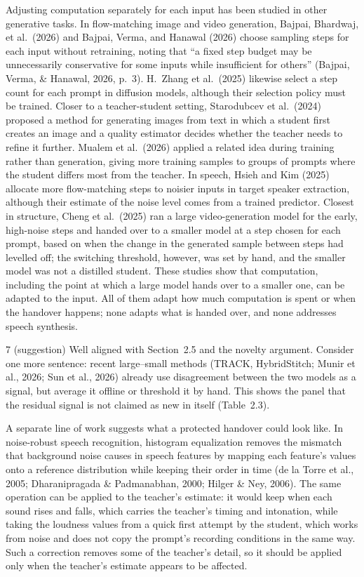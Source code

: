 \documentclass[11pt,a4paper]{article}
\newcommand{\add}[1]{{\color{addcol}#1}}
\newcounter{cmt}
\begin{document}
Adjusting computation separately for each input has been studied in other generative tasks. In flow-matching image and video generation, Bajpai, Bhardwaj, et al.\ (2026) and Bajpai, Verma, and Hanawal (2026) choose sampling steps for each input without retraining, noting that ``a fixed step budget may be unnecessarily conservative for some inputs while insufficient for others'' (Bajpai, Verma, \& Hanawal, 2026, p.~3). H.\ Zhang et al.\ (2025) likewise select a step count for each prompt in diffusion models, although their selection policy must be trained. Closer to a teacher-student setting, Starodubcev et al.\ (2024) proposed a method for generating images from text in which a student first creates an image and a quality estimator decides whether the teacher needs to refine it further. Mualem et al.\ (2026) applied a related idea during training rather than generation, giving more training samples to groups of prompts where the student differs most from the teacher. In speech, Hsieh and Kim (2025) allocate more flow-matching steps to noisier inputs in target speaker extraction, although their estimate of the noise level comes from a trained predictor. Closest in structure, Cheng et al.\ (2025) ran a large video-generation model for the early, high-noise steps and handed over to a smaller model at a step chosen for each prompt, based on when the change in the generated sample between steps had levelled off; the switching threshold, however, was set by hand, and the smaller model was not a distilled student. These studies show that computation, including the point at which a large model hands over to a smaller one, can be adapted to the input. All of them adapt how much computation is spent or when the handover happens; none adapts what is handed over, and none addresses speech synthesis.

\begin{cmt}{7 (suggestion)}
Well aligned with Section~2.5 and the novelty argument. Consider one more sentence: recent large--small methods (TRACK, HybridStitch; Munir et al., 2026; Sun et al., 2026) already use disagreement between the two models as a signal, but average it offline or threshold it by hand. This shows the panel that the residual signal is not claimed as new in itself (Table~2.3).
\end{cmt}

A separate line of work suggests what a protected handover could look like. In noise-robust speech recognition, histogram equalization removes the mismatch that background noise causes in speech features by mapping each feature's values onto a reference distribution while keeping their order in time (de la Torre et al., 2005; Dharanipragada \& Padmanabhan, 2000\add{; Hilger \& Ney, 2006}). The same operation can be applied to the teacher's estimate: it would keep when each sound rises and falls, which carries the teacher's timing and intonation, while taking the loudness values from a quick first attempt by the student, which works from noise and does not copy the prompt's recording conditions in the same way. Such a correction removes some of the teacher's detail, so it should be applied only when the teacher's estimate appears to be affected.
\end{document}

